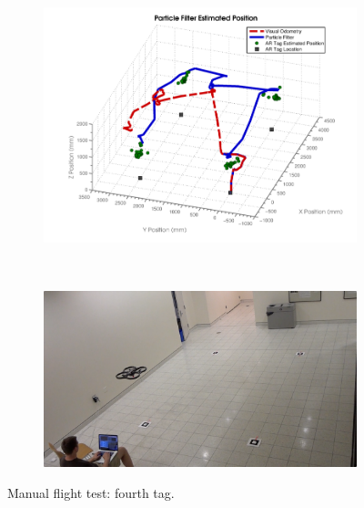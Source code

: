 	\begin{figure}[ht]
	        \centering
	        \begin{subfigure}[b]{0.75\textwidth}
	                \centering
	                \includegraphics[width=\textwidth]{../images/3dgraph_90.png}
	                \label{fig:tag4}
	        \end{subfigure}%
	        \\
	        \begin{subfigure}[b]{0.75\textwidth}
	                \centering
	                \includegraphics[width=\textwidth]{../images/frame4.png}
	                \label{fig:frame4}
	        \end{subfigure}
	        \caption{Manual flight test: fourth tag.}
	\end{figure}

